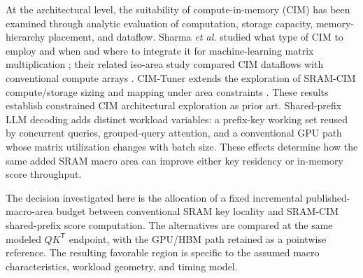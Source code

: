 At the architectural level, the suitability of compute-in-memory (CIM) has been examined through analytic evaluation of computation, storage capacity, memory-hierarchy placement, and dataflow. Sharma \emph{et al.} studied what type of CIM to employ and when and where to integrate it for machine-learning matrix multiplication \cite{Sharma2025WhatWhenWhere}; their related iso-area study compared CIM dataflows with conventional compute arrays \cite{Sharma2025Dataflow}. CIM-Tuner extends the exploration of SRAM-CIM compute/storage sizing and mapping under area constraints \cite{EXISTING_CIM_TUNER}. These results establish constrained CIM architectural exploration as prior art. Shared-prefix LLM decoding adds distinct workload variables: a prefix-key working set reused by concurrent queries, grouped-query attention, and a conventional GPU path whose matrix utilization changes with batch size. These effects determine how the same added SRAM macro area can improve either key residency or in-memory score throughput.

The decision investigated here is the allocation of a fixed incremental published-macro-area budget between conventional SRAM key locality and SRAM-CIM shared-prefix score computation. The alternatives are compared at the same modeled $QK^{\mathsf T}$ endpoint, with the GPU/HBM path retained as a pointwise reference. The resulting favorable region is specific to the assumed macro characteristics, workload geometry, and timing model.

